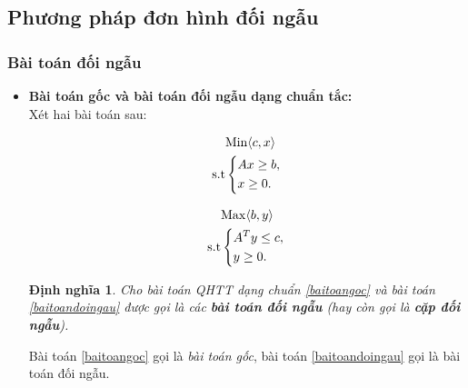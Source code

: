 \documentclass[12pt,a4paper]{report}
\newtheorem{dn}{Định nghĩa}
\begin{document}
\subsection{Phương pháp đơn hình đối ngẫu}
\subsubsection{ Bài toán đối ngẫu }
\begin{itemize}
    \item \textbf{Bài toán gốc và bài toán đối ngẫu dạng chuẩn tắc:}\\
    Xét hai bài toán sau:\\
    \begin{minipage}[t]{0.48\linewidth}
   \begin{equation}\label{baitoangoc}
     \begin{split}
          & {\rm{Min}} \langle c,x \rangle\\
          \rm{s.t} &\left\{\begin{split}
            & Ax\ge b,\\
            & x \ge 0.\\
           \end{split}\right.
       \end{split}
   \end{equation}
\end{minipage}\hfill
\begin{minipage}[t]{0.48\linewidth}
\begin{equation}\label{baitoandoingau}
    \begin{split}
        & {\rm{Max}} \langle b,y \rangle\\
       \rm{s.t} & \left\{\begin{split}
            &A^Ty \le c,\\
            & y\ge 0.\\
        \end{split}\right.
    \end{split}
\end{equation}
\end{minipage}
\begin{dn}
    Cho bài toán QHTT dạng chuẩn \eqref{baitoangoc} và bài toán \eqref{baitoandoingau} được gọi là các \textbf{bài toán đối ngẫu } (hay còn gọi là \textbf{cặp đối ngẫu}).\\
\end{dn}
Bài toán \eqref{baitoangoc} gọi là \textit{bài toán gốc}, bài toán \eqref{baitoandoingau} gọi là bài toán đối ngẫu.\\

\end{itemize}
\end{document}
